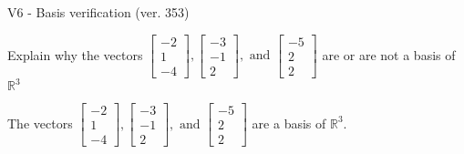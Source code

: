 \begin{exercise}
  \begin{exerciseTitle}V6 - Basis verification (ver. 353)\end{exerciseTitle}
  \begin{exerciseStatement}
    Explain why the vectors \(\left[\begin{array}{r}
-2 \\
1 \\
-4
\end{array}\right] , \left[\begin{array}{r}
-3 \\
-1 \\
2
\end{array}\right] , \text{ and } \left[\begin{array}{r}
-5 \\
2 \\
2
\end{array}\right]\) are or are not a basis of \(\mathbb{R}^3\)	


  \end{exerciseStatement}
  \begin{exerciseAnswer}
   The vectors \(\left[\begin{array}{r}
-2 \\
1 \\
-4
\end{array}\right] , \left[\begin{array}{r}
-3 \\
-1 \\
2
\end{array}\right] , \text{ and } \left[\begin{array}{r}
-5 \\
2 \\
2
\end{array}\right]\) 
  	 are  a basis of \(\mathbb{R}^3\).
  


  \end{exerciseAnswer}
\end{exercise}